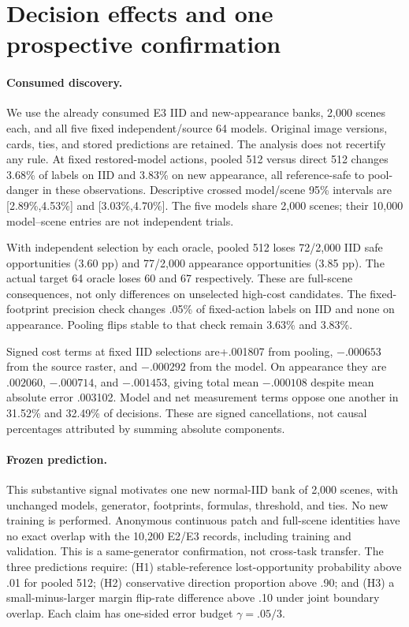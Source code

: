 \section{Decision effects and one prospective confirmation}
\label{sec:evidence}
\paragraph{Consumed discovery.}
We use the already consumed E3 IID and new-appearance banks, 2,000 scenes each,
and all five fixed independent/source 64 models. Original image versions, cards,
ties, and stored predictions are retained. The analysis does not recertify any
rule. At fixed restored-model actions, pooled 512 versus direct 512 changes 3.68\%
of labels on IID and 3.83\% on new appearance, all reference-safe to pool-danger
in these observations. Descriptive crossed model/scene 95\% intervals are
[2.89\%,4.53\%] and [3.03\%,4.70\%]. The five models share 2,000 scenes; their
10,000 model--scene entries are not independent trials.

With independent selection by each oracle, pooled 512 loses 72/2,000 IID safe
opportunities (3.60 pp) and 77/2,000 appearance opportunities (3.85 pp). The actual
target 64 oracle loses 60 and 67 respectively. These are full-scene consequences,
not only differences on unselected high-cost candidates. The fixed-footprint
precision check changes .05\% of fixed-action labels on IID and none on appearance.
Pooling flips stable to that check remain 3.63\% and 3.83\%.

Signed cost terms at fixed IID selections are+.001807 from pooling, $-.000653$
from the source raster, and $-.000292$ from the model. On appearance they are
$.002060$, $-.000714$, and $-.001453$, giving total mean $-.000108$ despite mean
absolute error .003102. Model and net measurement terms oppose one another in
31.52\% and 32.49\% of decisions. These are signed cancellations, not causal
percentages attributed by summing absolute components.

\paragraph{Frozen prediction.}
This substantive signal motivates one new normal-IID bank of 2,000 scenes, with
unchanged models, generator, footprints, formulas, threshold, and ties. No new
training is performed. Anonymous continuous patch and full-scene identities have
no exact overlap with the 10,200 E2/E3 records, including training and validation.
This is a same-generator confirmation, not cross-task transfer. The three
predictions require: (H1) stable-reference lost-opportunity probability above .01
for pooled 512; (H2) conservative direction proportion above .90; and (H3) a
small-minus-larger margin flip-rate difference above .10 under joint boundary
overlap. Each claim has one-sided error budget $\gamma=.05/3$.

